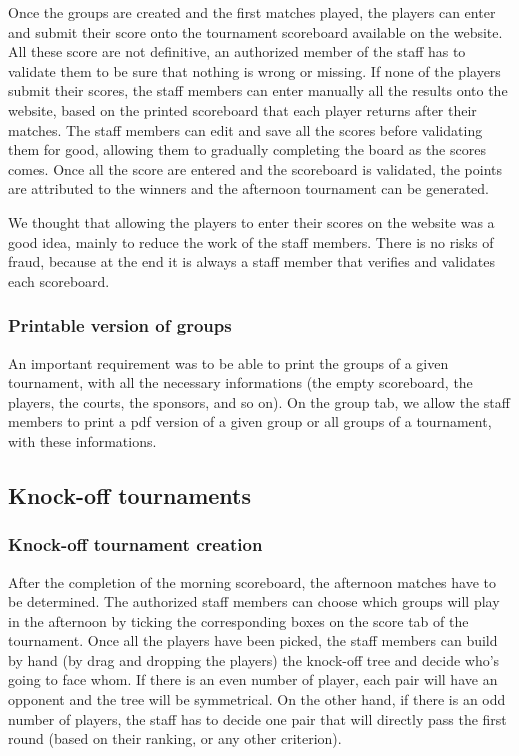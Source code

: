 Once the groups are created and the first matches played, the players can enter
and submit their score onto the tournament scoreboard available on the website.
All these score are not definitive, an authorized member of the staff has to
validate them to be sure that nothing is  wrong or missing. If none of the
players submit their scores, the staff members can enter manually all the
results onto the website, based on the printed scoreboard that each player
returns after their matches. The staff members can edit and save all the scores
before validating them for good, allowing them to gradually completing the
board as the scores comes. Once all the score are entered and the scoreboard is
validated, the points are attributed to the winners and the afternoon
tournament can be generated. \newline

We thought that allowing the players to enter their scores on the website was a
good idea, mainly to reduce the work of the staff members. There is no risks of
fraud, because at the end it is always a staff member that verifies and
validates each scoreboard.

\subsubsection{Printable version of groups}
\label{subs:Printable version of groups}


An important requirement was to be able to print the groups of a given
tournament, with all the necessary informations (the empty scoreboard, the
players, the courts, the sponsors, and so on). On the group tab, we allow the
staff members to print a pdf version of a given group or all groups of a
tournament, with these informations.

\subsection{Knock-off tournaments}
\label{sub:Knock-off tournaments}

\subsubsection{Knock-off tournament creation}
\label{subs:Knock-off tournament creation}


After the completion of the morning scoreboard, the afternoon matches have to
be determined. The authorized staff members can choose which groups will play
in the afternoon by ticking the corresponding boxes on the score tab of the
tournament. Once all the players have been picked, the staff members can build
by hand (by drag and dropping the players) the knock-off tree and decide who's
going to face whom. If there is an even number of player, each pair will have
an opponent and the tree will be symmetrical. On the other hand, if there is an
odd number of players, the staff has to decide one pair that will directly pass
the first round (based on their ranking, or any other criterion).\newline

